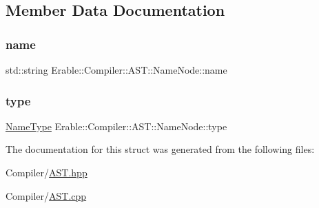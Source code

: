 \subsection{Member Data Documentation}
\mbox{\label{struct_erable_1_1_compiler_1_1_a_s_t_1_1_name_node_a11152e1bde7049caa9f7036016ad3098}} 
\subsubsection{\texorpdfstring{name}{name}}
{\footnotesize\ttfamily std\+::string Erable\+::\+Compiler\+::\+A\+S\+T\+::\+Name\+Node\+::name}

\mbox{\label{struct_erable_1_1_compiler_1_1_a_s_t_1_1_name_node_a63676b5da4555fa31cb7448ef3512d84}} 
\subsubsection{\texorpdfstring{type}{type}}
{\footnotesize\ttfamily \mbox{\hyperlink{namespace_erable_1_1_compiler_1_1_a_s_t_a9359137137aacfee07e935a0ae706a84}{Name\+Type}} Erable\+::\+Compiler\+::\+A\+S\+T\+::\+Name\+Node\+::type}



The documentation for this struct was generated from the following files\+:\begin{DoxyCompactItemize}
\item 
Compiler/\mbox{\hyperlink{_a_s_t_8hpp}{A\+S\+T.\+hpp}}\item 
Compiler/\mbox{\hyperlink{_a_s_t_8cpp}{A\+S\+T.\+cpp}}\end{DoxyCompactItemize}
